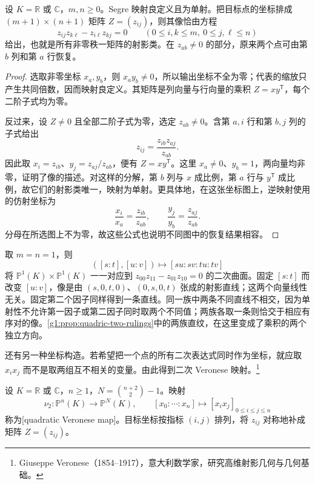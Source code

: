 \begin{proposition}\label{g1:prop:segre-rank-one}
	设 \(K=\mathbb R\) 或 \(\mathbb C\)，\(m,n\ge0\)。Segre 映射良定义且为单射。把目标点的坐标排成 \((m+1)\times(n+1)\) 矩阵 \(Z=(z_{ij})\)，则其像恰由方程
	\[
		z_{ij}z_{k\ell}-z_{i\ell}z_{kj}=0
		\qquad(0\le i,k\le m,\ 0\le j,\ell\le n)
	\]
	给出，也就是所有非零秩一矩阵的射影类。在 \(z_{ab}\ne0\) 的部分，原来两个点可由第 \(b\) 列和第 \(a\) 行恢复。
\end{proposition}
\begin{proof}
	选取非零坐标 \(x_a,y_b\)，则 \(x_a y_b\ne0\)，所以输出坐标不全为零；代表的缩放只产生共同倍数，因而映射良定义。其矩阵是列向量与行向量的乘积 \(Z=xy^{\mathsf T}\)，每个二阶子式均为零。

	反过来，设 \(Z\ne0\) 且全部二阶子式为零，选定 \(z_{ab}\ne0\)。含第 \(a,i\) 行和第 \(b,j\) 列的子式给出
	\[
		z_{ij}=\frac{z_{ib}z_{aj}}{z_{ab}}.
	\]
	因此取 \(x_i=z_{ib}\)、\(y_j=z_{aj}/z_{ab}\)，便有 \(Z=xy^{\mathsf T}\)。这里 \(x_a\ne0\)、\(y_b=1\)，两向量均非零，证明了像的描述。对这样的分解，第 \(b\) 列与 \(x\) 成比例，第 \(a\) 行与 \(y^{\mathsf T}\) 成比例，故它们的射影类唯一，映射为单射。更具体地，在这张坐标图上，逆映射使用的仿射坐标为
	\[
		\frac{x_i}{x_a}=\frac{z_{ib}}{z_{ab}},\qquad
		\frac{y_j}{y_b}=\frac{z_{aj}}{z_{ab}}.
	\]
	分母在所选图上不为零，故这些公式也说明不同图中的恢复结果相容。
\end{proof}

\begin{example}\label{g1:exm:segre-fibers}
	取 \(m=n=1\)，则
	\[
		([s:t],[u:v])\longmapsto[su:sv:tu:tv]
	\]
	将 \(\mathbb P^1(K)\times\mathbb P^1(K)\) 一一对应到 \(z_{00}z_{11}-z_{01}z_{10}=0\) 的二次曲面。固定 \([s:t]\) 而改变 \([u:v]\)，像是由 \((s,0,t,0)\)、\((0,s,0,t)\) 张成的射影直线；这两个向量线性无关。固定第二个因子同样得到一条直线。同一族中两条不同直线不相交，因为单射性不允许第一因子或第二因子同时取两个不同值；两族各取一条则恰交于相应有序对的像。\cref{g1:prop:quadric-two-rulings}中的两族直纹，在这里变成了乘积的两个独立方向。
\end{example}

还有另一种坐标构造。若希望把一个点的所有二次表达式同时作为坐标，就应取 \(x_i x_j\) 而不是取两组互不相关的变量。由此得到二次 Veronese 映射。\footnote{Giuseppe Veronese（1854--1917），意大利数学家，研究高维射影几何与几何基础。}

\begin{definition}[二次 Veronese 映射]\label{g1:def:veronese-map}
	设 \(K=\mathbb R\) 或 \(\mathbb C\)，\(n\ge1\)，\(N=\binom{n+2}{2}-1\)。映射
	\[
		\nu_2:\mathbb P^n(K)\longrightarrow\mathbb P^N(K),\qquad
		[x_0:\cdots:x_n]\longmapsto[x_i x_j]_{0\le i\le j\le n}
	\]
	称为[quadratic Veronese map]。目标坐标按指标 \((i,j)\) 排列，将 \(z_{ij}\) 对称地补成矩阵 \(Z=(z_{ij})\)。
\end{definition}

